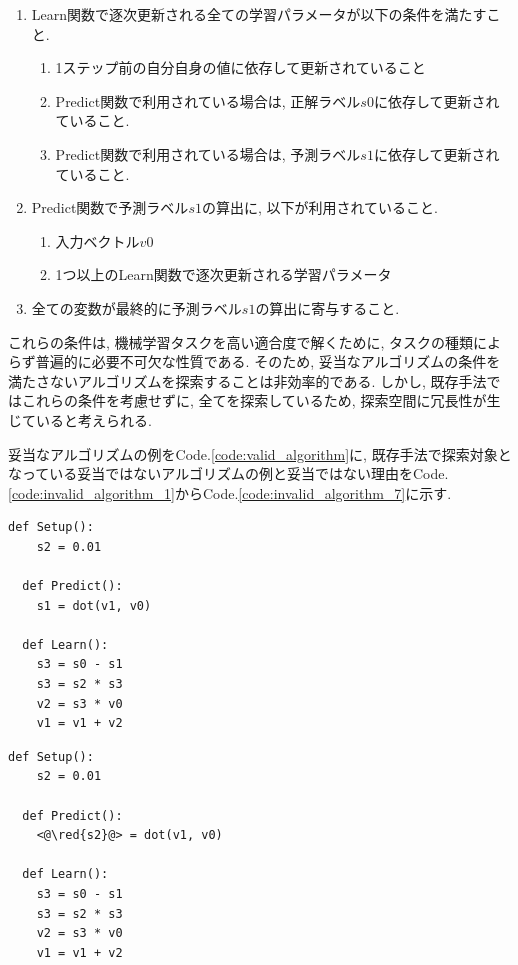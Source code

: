 \documentclass[11pt,oneside,openany,report]{jsbook}
\newcommand{\red}[1]{\textcolor{red}{#1}}
\begin{document}
\begin{enumerate}
  \item Learn関数で逐次更新される全ての学習パラメータが以下の条件を満たすこと.
  \begin{enumerate}
    \item 1ステップ前の自分自身の値に依存して更新されていること
    \item Predict関数で利用されている場合は, 正解ラベル$s0$に依存して更新されていること.
    \item Predict関数で利用されている場合は, 予測ラベル$s1$に依存して更新されていること.
  \end{enumerate}
  \item Predict関数で予測ラベル$s1$の算出に, 以下が利用されていること.
  \begin{enumerate}
    \item 入力ベクトル$v0$
    \item 1つ以上のLearn関数で逐次更新される学習パラメータ
  \end{enumerate}
  \item 全ての変数が最終的に予測ラベル$s1$の算出に寄与すること.
\end{enumerate}

これらの条件は, 機械学習タスクを高い適合度で解くために, タスクの種類によらず普遍的に必要不可欠な性質である. そのため, 妥当なアルゴリズムの条件を満たさないアルゴリズムを探索することは非効率的である. しかし, 既存手法ではこれらの条件を考慮せずに, 全てを探索しているため, 探索空間に冗長性が生じていると考えられる.

妥当なアルゴリズムの例をCode.\ref{code:valid_algorithm}に, 既存手法で探索対象となっている妥当ではないアルゴリズムの例と妥当ではない理由をCode.\ref{code:invalid_algorithm_1}からCode.\ref{code:invalid_algorithm_7}に示す.

\begin{multicols}{2}
  \begin{lstlisting}[caption=妥当な機械学習アルゴリズムの例,label=code:valid_algorithm]
  def Setup():
    s2 = 0.01

  def Predict():
    s1 = dot(v1, v0)

  def Learn():
    s3 = s0 - s1
    s3 = s2 * s3
    v2 = s3 * v0
    v1 = v1 + v2
  \end{lstlisting}

  \columnbreak

  \begin{lstlisting}[caption=妥当なアルゴリズムの条件4を満たさない非妥当なアルゴリズム,label=code:invalid_algorithm_1]
  def Setup():
    s2 = 0.01

  def Predict():
    <@\red{s2}@> = dot(v1, v0)

  def Learn():
    s3 = s0 - s1
    s3 = s2 * s3
    v2 = s3 * v0
    v1 = v1 + v2
\end{lstlisting}
\end{multicols}
\end{document}
